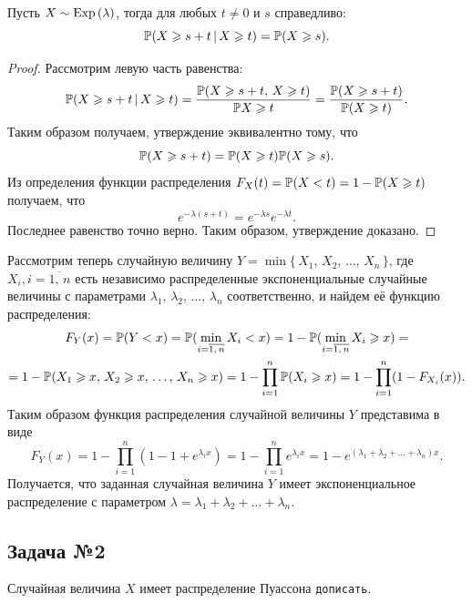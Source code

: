 \begin{assertion}
        Пусть $X\sim\mbox{Exp\,}(\lambda)$, тогда для любых $t \neq 0$ и $s$ справедливо:
$$
        \mathbb{P}(X\geqslant s+t\,|\,X\geqslant t) =
        \mathbb{P}(X \geqslant s).
$$
\end{assertion}

\begin{proof}
        Рассмотрим левую часть равенства:
$$
        \mathbb{P}(X \geqslant s + t\,|\,X\geqslant t) =
        \frac{\mathbb{P}(X \geqslant s + t,\,X\geqslant t)}{\mathbb{P}{X\geqslant t}} =
        \frac{\mathbb{P}(X \geqslant s + t)}{\mathbb{P}(X\geqslant t)}.
$$
Таким образом получаем, утверждение эквивалентно тому, что
$$
        \mathbb{P}(X\geqslant s+t) = 
        \mathbb{P}(X\geqslant t)\mathbb{P}(X\geqslant s).
$$
Из определения функции распределения $F_X(t) = \mathbb{P}(X < t) = 1 - \mathbb{P}(X \geqslant t)$ получаем, что
$$
        e^{-\lambda(s+t)} = e^{-\lambda s}e^{-\lambda t}.
$$
Последнее равенство точно верно. Таким образом, утверждение доказано.
\end{proof}

Рассмотрим теперь случайную величину $Y = \min\{\,X_1,\,X_2,\,\ldots,\,X_n\,\}$, где $X_i, i = \overline{1,\,n}$ есть независимо распределенные экспоненциальные случайные величины с параметрами $\lambda_1,\,\lambda_2,\,\ldots,\,\lambda_n$ соответственно, и найдем её функцию распределения:
\begin{multline*}
        F_Y(x) =
        \mathbb{P}(Y < x) = 
        \mathbb{P} (\min\limits_{i = \overline{1,\,n}} X_i < x) =
        1 - \mathbb{P} (\min\limits_{i = \overline{1,\,n}} X_i \geqslant x) =
        \\
        = 1 - \mathbb{P}(X_1 \geqslant x,\,X_2 \geqslant x,\,\ldots,\,X_n \geqslant x) =
        1 - \prod_{i = 1}^{n} \mathbb{P} (X_i \geqslant x) = 
        1 - \prod_{i = 1}^n(1 - F_{X_i}(x)).
\end{multline*}
Таким образом функция распределения случайной величины $Y$ представима в виде
$$
        F_Y(x) = 1 - \prod_{i = 1}^n (1 - 1 + e^{\lambda_i x}) =
        1 - \prod_{i = 1}^n e^{\lambda_i x} = 1 - e^{(\lambda_1 + \lambda_2 + \ldots + \lambda_n)x}.
$$
Получается, что заданная случайная величина $Y$ имеет экспоненциальное распределение с параметром $\lambda = \lambda_1 + \lambda_2 + \ldots + \lambda_n$.

\subsection{Задача №2}

\begin{definition}
        Случайная величина $X$ имеет распределение Пуассона \texttt{дописать}.
\end{definition}

